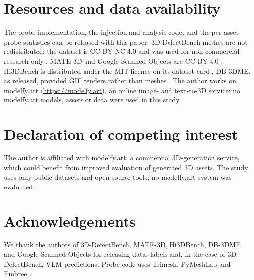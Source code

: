 \section*{Resources and data availability}
The probe implementation, the injection and analysis code, and the per-asset probe statistics can be released with this paper.
3D-DefectBench meshes are not redistributed: the dataset is CC BY-NC 4.0 and was used for non-commercial research only \citep{zhao2026defectbench}.
MATE-3D and Google Scanned Objects are CC BY 4.0 \citep{zhang2025mate3d,downs2022gso}.
Hi3DBench is distributed under the MIT licence on its dataset card \citep{zhang2025hi3deval}.
DB-3DME, as released, provided GIF renders rather than meshes \citep{jia2026db3dme}.
The author works on modelfy.art (\url{https://modelfy.art}), an online image- and text-to-3D service; no modelfy.art models, assets or data were used in this study.

\section*{Declaration of competing interest}
The author is affiliated with modelfy.art, a commercial 3D-generation service, which could benefit from improved evaluation of generated 3D assets.
The study uses only public datasets and open-source tools; no modelfy.art system was evaluated.

\section*{Acknowledgements}
We thank the authors of 3D-DefectBench, MATE-3D, Hi3DBench, DB-3DME and Google Scanned Objects for releasing data, labels and, in the case of 3D-DefectBench, VLM predictions.
Probe code uses Trimesh, PyMeshLab and Embree \citep{trimesh,cignoni2008meshlab,wald2014embree}.
